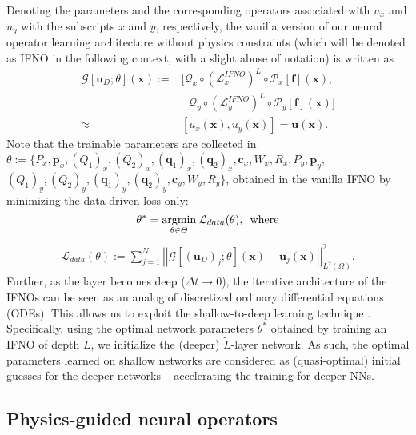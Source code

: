 \documentclass[twocolumn,10pt]{asme2ej}
\renewcommand{\~}{\tilde}
\renewcommand{\-}{\bar}
\newcommand{\8}{\infty}
\numberwithin{equation}{section}
\newcommand{\mcG}{\mathcal{G}}
\newcommand{\mcL}{\mathcal{L}}
\def\omg{{\Omega}}
\def \fb{\bm{f}}
\def \ub{\bm{u}}
\def \xb{\bm{x}}
\def \pb{\bm{p}}
\def \qb{\bm{q}}
\def \cb{\bm{c}}
\newcommand{\vertii}[1]{{\left\vert\left\vert #1
    \right\vert\right\vert}}
\begin{document}
Denoting the parameters and the corresponding operators associated with $u_x$ and $u_y$ with the subscripts $x$ and $y$, respectively, the vanilla version of our neural operator learning architecture without physics constraints (which will be denoted as IFNO in the following context, with a slight abuse of notation) is written as
\begin{align*}
\mcG[\ub_D;\theta](\xb):=&[\mathcal{Q}_x\circ(\mathcal{L}_x^{IFNO})^L\circ \mathcal{P}_x[\fb](\xb),\\
&~~~\mathcal{Q}_y\circ(\mathcal{L}_y^{IFNO})^L\circ \mathcal{P}_y[\fb](\xb)]\\
\approx &[u_x(\xb),u_y(\xb)]=\ub(\xb).
\end{align*}
Note that the trainable parameters are collected in  $\theta:=\{P_x,\pb_x,(Q_1)_x,(Q_2)_x,(\qb_1)_x,(\qb_2)_x,\cb_x,W_x,R_x,P_y,\pb_y,$
$(Q_1)_y,(Q_2)_y,(\qb_1)_y,(\qb_2)_y,\cb_y,W_y,R_y\}$, obtained in the vanilla IFNO by minimizing the data-driven loss only: %
\begin{equation*}%
\theta^*=\underset{\theta\in\Theta}{\text{argmin}}\;\mcL_{data}(\theta),\,\,\, {\rm where}
\end{equation*}
\begin{align}
\mcL_{data}(\theta):=\sum_{j=1}^N\vertii{\mcG[(\ub_D)_j;\theta](\xb)-\ub_j(\xb)}_{L^2(\omg)}^2.\label{eqn:ifno}    
\end{align}
%
Further, as the layer becomes deep ($\Delta t\rightarrow 0$), the iterative architecture of the IFNOs can be seen as an analog of discretized ordinary differential equations (ODEs). This allows us to exploit the shallow-to-deep learning technique \cite{haber2018learning,modersitzki2009fair,you2022nonlocal,you2022learning}. Specifically, using the optimal network parameters $\theta^*$ obtained by training an IFNO of depth $L$, we initialize the (deeper) $\widetilde L$-layer network. As such, the optimal parameters learned on shallow networks are considered as (quasi-optimal) initial guesses for the deeper networks -- accelerating the training for deeper NNs. 

\subsection{Physics-guided neural operators}\label{sec:pi}
\end{document}
